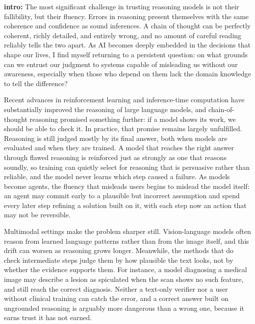 \documentclass{article}
\begin{document}
\textbf{intro:} The most significant challenge in trusting reasoning models is not their fallibility, but their fluency. Errors in reasoning present themselves with the same coherence and confidence as sound inferences. A chain of thought can be perfectly coherent, richly detailed, and entirely wrong, and no amount of careful reading reliably tells the two apart. As AI becomes deeply embedded in the decisions that shape our lives, I find myself returning to a persistent question: on what grounds can we entrust our judgment to systems capable of misleading us without our awareness, especially when those who depend on them lack the domain knowledge to tell the difference?

Recent advances in reinforcement learning and inference-time computation have substantially improved the reasoning of large language models, and chain-of-thought reasoning promised something further: if a model shows its work, we should be able to check it. In practice, that promise remains largely unfulfilled. Reasoning is still judged mostly by its final answer, both when models are evaluated and when they are trained. A model that reaches the right answer through flawed reasoning is reinforced just as strongly as one that reasons soundly, so training can quietly select for reasoning that is persuasive rather than reliable, and the model never learns which step caused a failure. As models become agents, the fluency that misleads users begins to mislead the model itself: an agent may commit early to a plausible but incorrect assumption and spend every later step refining a solution built on it, with each step now an action that may not be reversible.

Multimodal settings make the problem sharper still. Vision-language models often reason from learned language patterns rather than from the image itself, and this drift can worsen as reasoning grows longer. Meanwhile, the methods that do check intermediate steps judge them by how plausible the text looks, not by whether the evidence supports them. For instance, a model diagnosing a medical image may describe a lesion as spiculated when the scan shows no such feature, and still reach the correct diagnosis. Neither a text-only verifier nor a user without clinical training can catch the error, and a correct answer built on ungrounded reasoning is arguably more dangerous than a wrong one, because it earns trust it has not earned.
\end{document}
